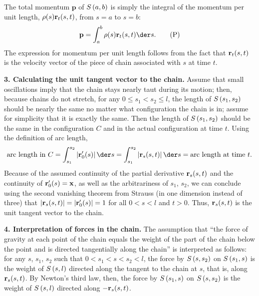 \documentclass{homework}
\begin{document}
\newcommand{\momentum}{\mathbf{p}}
The total momentum \(\momentum\) of \({S\left({a}, {b}\right)}\) is simply the integral of the momentum per unit length, \(\rho(s)\mathbf{r}_t(s, t)\), from \(s=a\) to \(s=b\):
\begin{equation*}
	\momentum = \int_a^b\rho(s)\pos_t(s, t)\der s. \tag{P}
\end{equation*}
The expression for momentum per unit length follows from the fact that \(\mathbf{r}_t(s, t)\) is the velocity vector of the piece of chain associated with \(s\) at time \(t\). 

\textbf{3. Calculating the unit tangent vector to the chain.}
Assume that small oscillations imply that the chain stays nearly taut during its motion; then, because chains do not stretch, for any \(0\le s_1 < s_2\le l\), the length of \({S\left({s_1}, {s_2}\right)}\) should be nearly the same no matter what configuration the chain is in; assume for simplicity that it is exactly the same. Then the length of \({S\left({s_1}, {s_2}\right)}\) should be the same in the configuration \(C\) and in the actual configuration at time \(t\). Using the definition of arc length,
\begin{equation*}
	\text{arc length in } C = \int_{s_1}^{s_2}\left|\pos_0^\prime(s)\right|\der s = \int_{s_1}^{s_2}\left|\pos_s(s, t)\right|\der s = \text{arc length at time } t.
\end{equation*}
Because of the assumed continuity of the partial derivative \(\mathbf{r}_s(s, t)\) and the continuity of \(\mathbf{r}_0^\prime(s) = \mathbf{x}\), as well as the arbitrariness of \(s_1\), \(s_2\), we can conclude using the second vanishing theorem from Strauss (in one dimension instead of three) that \(\left|\mathbf{r}_s(s, t)\right| = \left|\mathbf{r}_0^\prime(s)\right| = 1\) for all \(0 < s < l\) and \(t > 0\). Thus, \(\mathbf{r}_s(s, t)\) is the unit tangent vector to the chain.

\newcommand{\force}{\mathbf{F}}
\newcommand{\forceabove}{\force_{\text{above}}}
\newcommand{\forcebelow}{\force_{\text{below}}}
\newcommand{\forcegravity}{\mathbf{w}}

\textbf{4. Interpretation of forces in the chain.}
The assumption that ``the force of gravity at each point of the chain equals the weight of the part of the chain below the point and is directed tangentially along the chain'' is interpreted as follows: for any \(s\), \(s_1\), \(s_2\) such that \(0 < s_1 < s < s_2 < l\), the force by \({S\left({s}, {s_2}\right)}\) on \({S\left({s_1}, {s}\right)}\) is the weight of \({S\left({s}, {l}\right)}\) directed along the tangent to the chain at \(s\), that is, along \(\mathbf{r}_s(s, t)\). By Newton's third law, then, the force by \({S\left({s_1}, {s}\right)}\) on \({S\left({s}, {s_2}\right)}\) is the weight of \({S\left({s}, {l}\right)}\) directed along \(-\mathbf{r}_s(s, t)\).
\end{document}
